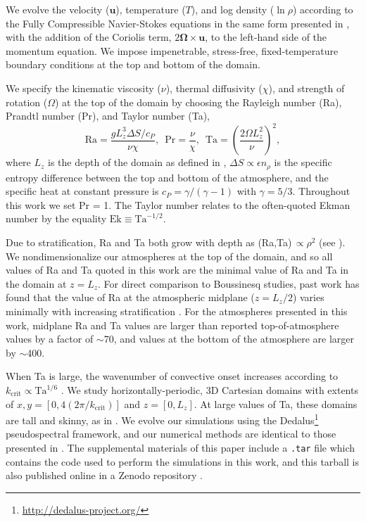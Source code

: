 We evolve the velocity ($\bm{u}$), temperature ($T$), 
and log density ($\ln\rho$) according to the Fully Compressible Navier-Stokes equations
in the same form presented in \AB, with the
addition of the Coriolis term, \mbox{$2\bm{\Omega}\times\bm{u}$}, to the left-hand side
of the momentum equation. 
We impose impenetrable, stress-free, fixed-temperature boundary conditions at the top and bottom of the domain.


We specify the kinematic viscosity ($\nu$), thermal diffusivity ($\chi$), and strength of
rotation ($\Omega$) at the top of the domain by choosing the Rayleigh number 
(Ra), Prandtl number (Pr), and Taylor number (Ta),
\begin{equation}
    \text{Ra} = \frac{g L_z^3 \Delta S / c_P}{\nu \chi}, \,\,\,
    \text{Pr} = \frac{\nu}{\chi}, \,\,\,
    \text{Ta} = \left(\frac{2 \Omega L_z^2}{\nu}\right)^2,
	\label{eqn:input_parameters}
\end{equation}
where $L_z$ is the depth of the domain as defined in \AB, 
$\Delta S \propto \epsilon n_\rho$ is the specific entropy difference between
the top and bottom of the atmosphere, and the specific heat at constant pressure is $c_P = \gamma/(\gamma-1)$
with $\gamma = 5/3$.
Throughout this work we set Pr = 1. The Taylor number relates to the often-quoted
Ekman number by the equality $\text{Ek} \equiv \text{Ta}^{-1/2}$.

Due to stratification, Ra and Ta both grow with depth as (Ra,Ta)$\, \propto \rho^2$ (see \AB).
We nondimensionalize our atmospheres at the top of the domain, and so all values of Ra and
Ta quoted in this work are the minimal value of Ra and Ta in the domain at $z = L_z$.
For direct comparison to Boussinesq studies, past work has found that the value of Ra 
at the atmospheric midplane ($z = L_z/2$) varies minimally with increasing stratification 
\cite{unnoetall1960}. For the atmospheres presented in this work, 
midplane Ra and Ta values
are larger than reported top-of-atmosphere values by a factor of $\sim$70, and values at the
bottom of the atmosphere are larger by $\sim$400.

When Ta is large, the wavenumber of convective onset increases according to $k_{\text{crit}} \propto \text{Ta}^{1/6}$
\cite{Chandrasekhar,calkins&all2015a}.
We study horizontally-periodic, 3D Cartesian domains with extents of
$x, y = [0, 4(2\pi/k_{\text{crit}})]$ and $z = [0, L_z]$. At large values of Ta, these
domains are tall and skinny, as in \cite{stellmach&all2014}.
We evolve our simulations using the Dedalus\footnote{\url{http://dedalus-project.org/}} 
pseudospectral framework, and our numerical methods are identical to those presented
in \AB. The supplemental materials of this paper include a \texttt{.tar} file which
contains the code used to perform the simulations in this work,
and this tarball is also published online in a Zenodo repository \cite{supp_andersetall2019a}.

